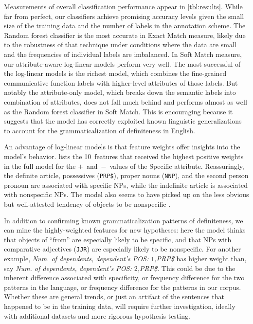 \documentclass[11pt,letterpaper]{article}
\begin{document}
Measurements of overall classification performance appear in \cref{tbl:results}. While far from perfect, our classifiers achieve promising accuracy levels 
given the small size of the training data and the number of labels in the annotation scheme.
The Random forest classifier is the most accurate in Exact Match measure, likely due to the robustness of that technique under
conditions where the data are small and the frequencies of individual labels are imbalanced. In Soft Match measure, our attribute-aware log-linear models perform very well. The most successful of the log-linear models is the richest model, which combines the fine-grained 
communicative function labels with higher-level attributes of those labels. But notably the attribute-only model,
which breaks down the semantic labels into combination of attributes, does not fall much behind and performs almost as well as the Random forest classifier in Soft Match.
This is encouraging because it suggests that the model has correctly exploited known linguistic generalizations 
to account for the grammaticalization of definiteness in English. 


An advantage of log-linear models is that feature weights offer insights into the model's behavior.
 lists the 10~features that received the highest positive weights in the full model 
for the \mbox{$+$ and $-$ values} of the Specific attribute. Reassuringly, the definite article, 
possessives (\texttt{PRP\$}), proper nouns (\texttt{NNP}), and the second person pronoun 
are associated with specific NPs, while the indefinite article is associated with nonspecific NPs.
The model also seems to have picked up on the less obvious but well-attested tendency 
of objects to be nonspecific \citep{aissen-03}.


In addition to confirming known grammaticalization patterns of definiteness, 
we can mine the highly-weighted features for new hypotheses: 
here the model thinks that objects of ``from'' are especially likely to be specific, 
and that NPs with comparative adjectives (\texttt{JJR}) are especially likely to be nonspecific. For another example, \emph{Num. of dependents, dependent's POS: $1$,PRP\$} has higher weight than, say \emph{Num. of dependents, dependent's POS: $2$,PRP\$}. This could be due to the inherent difference associated with specificity, or frequency difference for the two patterns in the language, or frequency difference for the patterns in our corpus. Whether these are general trends, or just an artifact of the sentences that happened to be in the training data, 
will require further investigation, ideally with additional datasets and more rigorous hypothesis testing.
\end{document}
